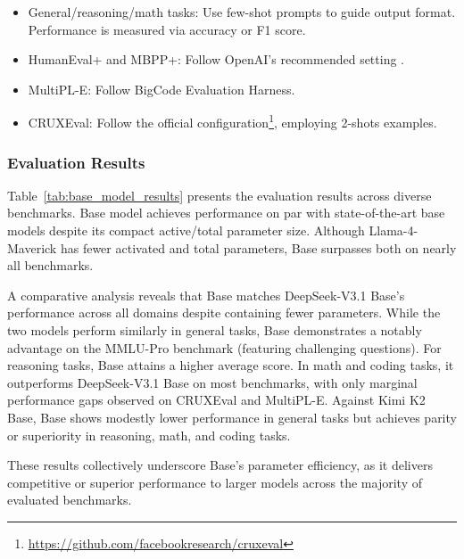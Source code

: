 \begin{itemize}
\item General/reasoning/math tasks: Use few-shot prompts to guide output format. Performance is measured via accuracy or F1 score.

\item HumanEval+ and MBPP+: Follow OpenAI's recommended setting \citep{chen2021codex}.

\item MultiPL-E: Follow BigCode Evaluation Harness\citep{bigcode-evaluation-harness}.
\item CRUXEval: Follow the official configuration\footnote{\url{https://github.com/facebookresearch/cruxeval}}, employing 2-shots examples.

\end{itemize}

\subsubsection{Evaluation Results}

Table~\ref{tab:base_model_results} presents the evaluation results across diverse benchmarks. \longcat Base model achieves performance on par with state-of-the-art base models despite its compact active/total parameter size. Although Llama-4-Maverick has fewer activated and total parameters, \longcat Base surpasses both on nearly all benchmarks.

A comparative analysis reveals that \longcat Base matches DeepSeek-V3.1 Base's performance across all domains despite containing fewer parameters. While the two models perform similarly in general tasks, \longcat Base demonstrates a notably advantage on the MMLU-Pro benchmark (featuring challenging questions). For reasoning tasks, \longcat Base attains a higher average score. In math and coding tasks, it outperforms DeepSeek-V3.1 Base on most benchmarks, with only marginal performance gaps observed on CRUXEval and MultiPL-E. Against Kimi K2 Base, \longcat Base shows modestly lower performance in general tasks but achieves parity or superiority in reasoning, math, and coding tasks. 

These results collectively underscore \longcat Base's parameter efficiency, as it delivers competitive or superior performance to larger models across the majority of evaluated benchmarks.


